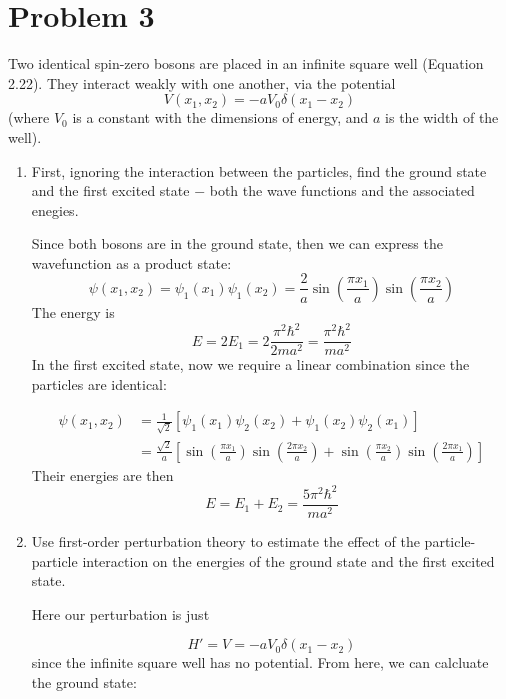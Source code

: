 \documentclass[10pt]{article}
\begin{document}
    \section*{Problem 3}
    Two identical spin-zero bosons are placed in an infinite square well (Equation 2.22). They interact weakly with one another, via the potential
    \[ V(x_1, x_2) = -aV_0 \delta(x_1 - x_2)\]
    (where $V_0$ is a constant with the dimensions of energy, and $a$ is the width of the well). 
    \begin{enumerate}[label=(\alph*)]
        \item First, ignoring the interaction between the particles, find the ground state and the first excited state $-$ both the wave functions and the associated enegies.
        
        \begin{solution}
            Since both bosons are in the ground state, then we can express the wavefunction as a product state: 
            \[ \psi(x_1, x_2) = \psi_1(x_1) \psi_1(x_2) = \frac{2}{a} \sin\left( \frac{\pi x_1}{a}\right) \sin \left( \frac{\pi x_2}{a}\right)\]
            The energy is
            \[ E = 2E_1 = 2 \frac{\pi^2 \hbar^2}{2ma^2} = \frac{\pi^2 \hbar^2}{ma^2}\]
            In the first excited state, now we require a linear combination since the particles are identical: 

            \begin{align*}
                \psi(x_1, x_2) &= \frac{1}{\sqrt{2}} \left[ \psi_1(x_1) \psi_2(x_2) + \psi_1(x_2) \psi_2(x_1)\right]\\
                &= \frac{\sqrt 2}{a} \left[\sin \left( \frac{\pi x_1}{a}\right) \sin \left( \frac{2\pi x_2}{a}\right) + \sin \left(\frac{\pi x_2}{a}\right) \sin \left( \frac{2\pi x_1}{a}\right) \right]
            \end{align*}
            Their energies are then 
            \[ E = E_1 + E_2 = \frac{5 \pi^2 \hbar^2}{ma^2}\]
        \end{solution}
        \item Use first-order perturbation theory to estimate the effect of the particle-particle interaction on the energies of the ground state and the first excited state.
        
        \begin{solution}
            Here our perturbation is just 
            
            \[H' = V = -aV_0\delta(x_1 - x_2)\]
            since the infinite square well has no potential. From here, we can calcluate the ground state:


\end{solution}
\end{enumerate}
\end{document}
